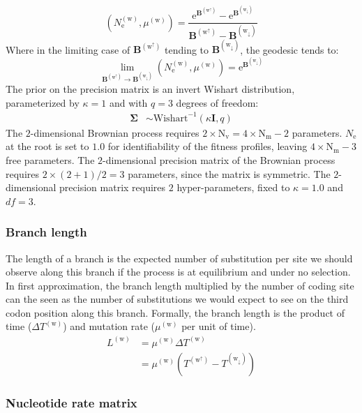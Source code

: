 \documentclass{article}
\newcommand{\taxon}{\text{m}}
\newcommand{\Ntaxa}{\text{N}_{\taxon}}
\newcommand{\branch}{\text{w}}
\newcommand{\up}{\branch^{\uparrow}}
\newcommand{\down}{\branch_{\downarrow}}
\newcommand{\node}{\text{v}}
\newcommand{\Nnode}{\text{N}_{\node}}
\newcommand{\e}{\mathrm{e}}
\newcommand{\Ne}{N_\e}
\newcommand{\covariance}{\bm{\Sigma}}
\newcommand{\brownian}{\bm{B}}
\begin{document}
\begin{equation}
\left(\Ne^{(\branch)}, \mu^{(\branch)}\right) = \dfrac{\e^{\brownian^{(\up)}} - \e^{\brownian^{(\down)}}}{\brownian^{(\up)} - \brownian^{(\down)}}
\end{equation}
Where in the limiting case of $\brownian^{(\up)}$ tending to $\brownian^{(\down)}$, the geodesic tends to:
\begin{equation}
\lim_{\brownian^{(\up)} \to \brownian^{(\down)}} \left(\Ne^{(\branch)}, \mu^{(\branch)}\right) =  \e^{\brownian^{(\down)}}
\end{equation}
The prior on the precision matrix is an invert Wishart distribution, parameterized by $\kappa=1$ and with $q=3$ degrees of freedom:
\begin{align}
\covariance & \sim \mathrm{Wishart}^{-1} (\kappa \bm{I}, q)
\end{align}
The $2$-dimensional Brownian process requires $ 2 \times \Nnode =  4 \times \Ntaxa - 2 $ parameters.
$\Ne$ at the root is set to $1.0$ for identifiability of the fitness profiles, leaving $4 \times \Ntaxa - 3 $ free parameters.
The $2$-dimensional precision matrix of the Brownian process requires $2 \times (2 + 1) / 2 = 3$ parameters, since the matrix is symmetric.
The $2$-dimensional precision matrix requires $2$ hyper-parameters, fixed to $\kappa=1.0$ and $df=3$.

\subsubsection{Branch length}

The length of a branch is the expected number of substitution per site we should observe along this branch if the process is at equilibrium and under no selection. In first approximation, the branch length multiplied by the number of coding site can the seen as the number of substitutions we would expect to see on the third codon position along this branch.
Formally, the branch length is the product of time ($\Delta T^{(\branch)}$) and mutation rate ($\mu^{(\branch)}$ per unit of time). 
\begin{align}
L^{(\branch)} & = \mu^{(\branch)} \Delta T^{(\branch)} \nonumber \\
			  & = \mu^{(\branch)} \left( T^{(\up)} - T^{(\down)} \right)
\end{align}


\subsubsection{Nucleotide rate matrix}
\end{document}
